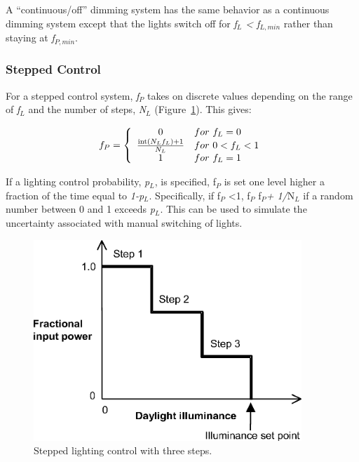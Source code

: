 A ``continuous/off'' dimming system has the same behavior as a continuous dimming system except that the lights switch off for \emph{f\(_{L}\) \textless{} f\(_{L,min}\)} rather than staying at \emph{f\(_{P,min}\)}.

\subsubsection{Stepped Control}\label{stepped-control}

For a stepped control system, \emph{f\(_{P}\)} takes on discrete values depending on the range of \emph{f\(_{L}\)} and the number of steps, \emph{N\(_{L}\)} (Figure~\ref{fig:stepped-lighting-control-with-three-steps.}). This gives:

\begin{equation}
  f_P = \left\{
          \begin{array}{cl}
            0 & for~f_L = 0 \\
            \frac{\mathop{\rm int} (N_L f_L) + 1}{N_L} & for~0 < f_L < 1 \\
            1 & for~f_L = 1
          \end{array}
         \right.
\end{equation}

If a lighting control probability, \emph{p\(_{L}\)}, is specified, f\(_{P}\) is set one level higher a fraction of the time equal to \emph{1-p\(_{L}\)}. Specifically, if f\(_{P}\) \textless{}1, f\(_{P}\) {\to} f\(_{P}\)\emph{+ 1/}N\(_{L}\) if a random number between 0 and 1 exceeds \emph{p\(_{L}\)}. This can be used to simulate the uncertainty associated with manual switching of lights.

\begin{figure}[hbtp] %
\centering
\includegraphics[width=0.9\textwidth, height=0.9\textheight, keepaspectratio=true]{media/image825.png}
\caption{Stepped lighting control with three steps. \protect \label{fig:stepped-lighting-control-with-three-steps.}}
\end{figure}

